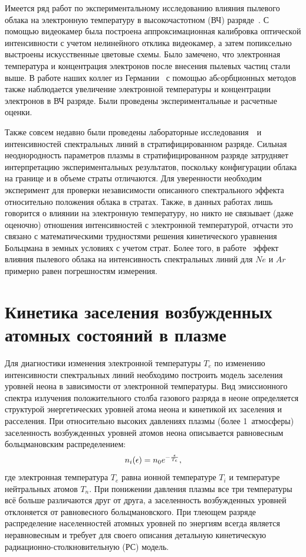 Имеется ряд работ по экспериментальному исследованию влияния пылевого облака на электронную температуру в
высокочастотном (ВЧ) разряде~\cite{Samsonov1999}. С помощью видеокамер была построена аппроксимационная калибровка
оптической интенсивности с учетом нелинейного отклика видеокамер, а затем попиксельно выстроены искусственные
цветовые схемы. Было замечено, что электронная температура и концентрация электронов после внесения пылевых частиц стали выше.
В работе наших коллег из Германии~\cite{Mitic2009} с помощью абcорбционных методов также наблюдается увеличение
электронной температуры и концентрации электронов в ВЧ разряде. Были проведены экспериментальные и расчетные оценки.

Также совсем недавно были проведены лабораторные исследования~\cite{Pikalev2018}~и~\cite{Kostenko} интенсивностей спектральных линий
в стратифицированном разряде. Сильная неоднородность параметров плазмы в стратифицированном разряде затрудняет интерпретацию
экспериментальных результатов, поскольку конфигурации облака на границе и в объеме страты отличаются.
Для уверенности необходим эксперимент для проверки независимости описанного спектрального эффекта относительно положения облака в стратах.
Также, в данных работах лишь говорится о влиянии на электронную температуру, но никто
не связывает (даже оценочно) отношения интенсивностей с электронной температурой, отчасти это связано с математическими
трудностями решения кинетического уравнения Больцмана в земных условиях с учетом страт.
Более того, в работе~\cite{Pikalev2018} эффект влияния пылевого облака на
интенсивность спектральных линий для $Ne$ и $Ar$ примерно равен погрешностям измерения.

\section{Кинетика заселения возбужденных атомных состояний в плазме}
\label{sec:kinetika}
Для диагностики изменения электронной температуры $T_e$ по изменению
интенсивности спектральных линий необходимо построить модель заселения уровней
неона в зависимости от электронной температуры. Вид эмиссионного спектра
излучения положительного столба газового разряда в неоне определяется
структурой энергетических уровней атома неона и кинетикой их заселения и
расселения. При относительно высоких давлениях плазмы (более 1~атмосферы) заселенность
возбужденных уровней атомов неона описывается равновесным больцмановским
распределением:
\begin{equation}
    n_i(\epsilon) = n_0 e^{- {\epsilon \over T_e}},
\end{equation}
где электронная температура $T_e$ равна ионной температуре $T_i$ и температуре
нейтральных атомов $T_n$. При понижении давления плазмы все три температуры всё
больше различаются друг от друга, а заселенность возбужденных уровней
отклоняется от равновесного больцмановского. При тлеющем разряде распределение населенностей атомных уровней по
энергиям всегда является неравновесным и требует для своего описания детальную
кинетическую радиационно-столкновительную (РС) модель.

